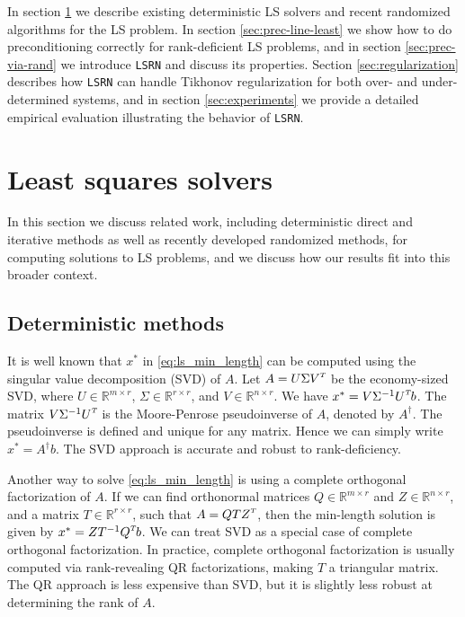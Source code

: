 \documentclass{siamltex}
\newcommand{\T}{^{\raisebox{0.09em}{\hbox{\tiny $T$}}\hspace{-0.1em}}}
\begin{document}
In section \ref{sec:linear-least-squares} we describe existing deterministic LS
solvers and recent randomized algorithms for the LS problem.  In section
\ref{sec:prec-line-least} we show how to do preconditioning correctly for
rank-deficient LS problems, and in section \ref{sec:prec-via-rand} we introduce
\texttt{LSRN} and discuss its properties.  Section \ref{sec:regularization}
describes how \texttt{LSRN} can handle Tikhonov regularization for both over-
and under-determined systems, and in section \ref{sec:experiments} we provide a
detailed empirical evaluation illustrating the behavior of \texttt{LSRN}.


\section{Least squares solvers}
\label{sec:linear-least-squares}

In this section we discuss related work, including deterministic direct and
iterative methods as well as recently developed randomized methods, for
computing solutions to LS problems, and we discuss how our results fit into this
broader context.

\subsection{Deterministic methods}
\label{sec:deter-method}

It is well known that $x^*$ in \eqref{eq:ls_min_length} can be computed using
the singular value decomposition (SVD) of $A$. Let $A = U \Sigma V\T$ be the
economy-sized SVD, where $U \in \mathbb{R}^{m \times r}$, $\Sigma \in
\mathbb{R}^{r \times r}$, and $V \in \mathbb{R}^{n \times r}$. We have $x^* = V
\Sigma^{-1} U\T b$.  The matrix $V \Sigma^{-1} U\T$ is the Moore-Penrose
pseudoinverse of $A$, denoted by $A^\dagger$. The pseudoinverse is defined and
unique for any matrix. Hence we can simply write $x^* = A^\dagger b$. The SVD
approach is accurate and robust to rank-deficiency.

Another way to solve \eqref{eq:ls_min_length} is using a complete orthogonal
factorization of $A$. If we can find orthonormal matrices $Q \in \mathbb{R}^{m
  \times r}$ and $Z \in \mathbb{R}^{n \times r}$, and a matrix $T \in
\mathbb{R}^{r \times r}$, such that $A = Q T Z\T$, then the min-length solution
is given by $x^* = Z T^{-1} Q\T b$. We can treat SVD as a special case of
complete orthogonal factorization. In practice, complete orthogonal
factorization is usually computed via rank-revealing QR factorizations, making
$T$ a triangular matrix. The QR approach is less expensive than SVD, but it is
slightly less robust at determining the rank of $A$.
\end{document}
